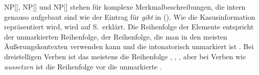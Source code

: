 NP[], NP[] und NP[] stehen für komplexe Merkmalbeschreibungen, die intern
genauso aufgebaut sind wie der Eintrag für \emph{gibt} in (). Wie die Kasusinformation
repräsentiert wird, wird auf S.\,\pageref{page-ref-case-feat} erklärt. Die Reihenfolge der
Elemente entspricht der unmarkierten Reihenfolge\label{page-unmarkierte-Reihenfolge}, \dash der Reihenfolge, die man in den meisten
Äußerungskontexten verwenden kann und die intonatorisch unmarkiert ist \citep{Hoehle82a}. Bei dreistelligen Verben ist
das meistens die Reihenfolge , , , aber bei Verben wie
\emph{aussetzen} ist die Reihenfolge  vor  die unmarkierte \parencites[]{Wegener85b}[]{Hoberg81a}. 
%

